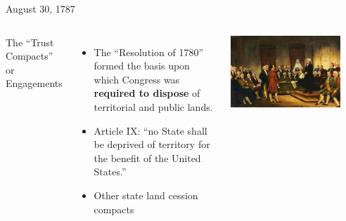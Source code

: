 \begin{frame}{August 30, 1787}
    \begin{columns}[onlytextwidth]
            The ``Trust Compacts'' or Engagements
            \vspace{10pt}
            \begin{itemize}
                \item The ``Resolution of 1780'' formed the basis upon which Congress was \textbf{required to dispose} of territorial and public lands.
                \item Article IX: ``no State shall be deprived of territory for the benefit of the United States.''
                \item Other state land cession compacts
            \end{itemize}
            \includegraphics[width=0.85\textwidth]{img/convention.png} \\
    \end{columns}
\end{frame}



